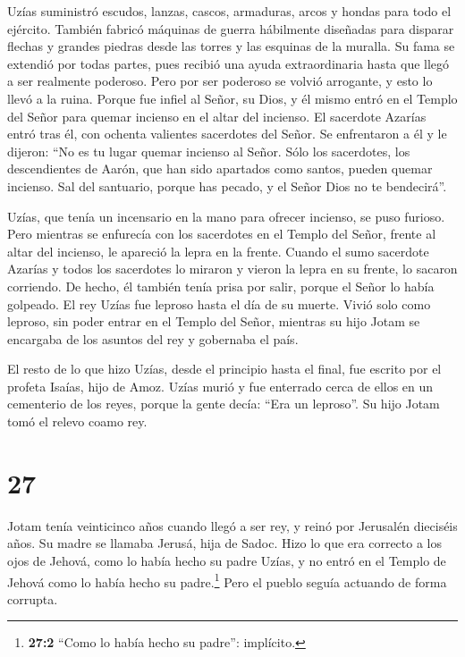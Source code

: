  Uzías suministró escudos, lanzas, cascos, armaduras, arcos
y hondas para todo el ejército.  También fabricó máquinas
de guerra hábilmente diseñadas para disparar flechas y grandes piedras
desde las torres y las esquinas de la muralla. Su fama se extendió por
todas partes, pues recibió una ayuda extraordinaria hasta que llegó a
ser realmente poderoso.  Pero por ser poderoso se volvió
arrogante, y esto lo llevó a la ruina. Porque fue infiel al Señor, su
Dios, y él mismo entró en el Templo del Señor para quemar incienso en el
altar del incienso.  El sacerdote Azarías entró tras él,
con ochenta valientes sacerdotes del Señor.  Se enfrentaron
a él y le dijeron: ``No es tu lugar quemar incienso al Señor. Sólo los
sacerdotes, los descendientes de Aarón, que han sido apartados como
santos, pueden quemar incienso. Sal del santuario, porque has pecado, y
el Señor Dios no te bendecirá''.

 Uzías, que tenía un incensario en la mano para ofrecer
incienso, se puso furioso. Pero mientras se enfurecía con los sacerdotes
en el Templo del Señor, frente al altar del incienso, le apareció la
lepra en la frente.  Cuando el sumo sacerdote Azarías y
todos los sacerdotes lo miraron y vieron la lepra en su frente, lo
sacaron corriendo. De hecho, él también tenía prisa por salir, porque el
Señor lo había golpeado.  El rey Uzías fue leproso hasta el
día de su muerte. Vivió solo como leproso, sin poder entrar en el Templo
del Señor, mientras su hijo Jotam se encargaba de los asuntos del rey y
gobernaba el país.

 El resto de lo que hizo Uzías, desde el principio hasta el
final, fue escrito por el profeta Isaías, hijo de Amoz. 
Uzías murió y fue enterrado cerca de ellos en un cementerio de los
reyes, porque la gente decía: ``Era un leproso''. Su hijo Jotam tomó el
relevo coamo rey.

\hypertarget{section-26}{%
\section{27}\label{section-26}}

 Jotam tenía veinticinco años cuando llegó a ser rey, y
reinó por Jerusalén dieciséis años. Su madre se llamaba Jerusá, hija de
Sadoc.  Hizo lo que era correcto a los ojos de Jehová, como
lo había hecho su padre Uzías, y no entró en el Templo de Jehová como lo
había hecho su padre.\footnote{\textbf{27:2} ``Como lo había hecho su
  padre'': implícito.} Pero el pueblo seguía actuando de forma corrupta.

